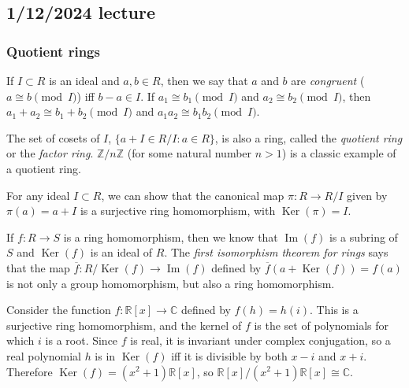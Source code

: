 \documentclass[12pt]{article}
\begin{document}
\subsection{1/12/2024 lecture}
\subsubsection{Quotient rings}
If $I \subset R$ is an ideal and $a, b \in R$, then we say that $a$ and $b$ are \textit{congruent} ($a \cong b \pmod{I}$) iff $b-a \in I$. If $a_1 \cong b_1 \pmod{I}$ and $a_2 \cong b_2 \pmod{I}$, then $a_1 + a_2 \cong b_1 + b_2 \pmod{I}$ and $a_1a_2 \cong b_1b_2 \pmod{I}$.
\par
The set of cosets of $I$, $\{a+I\in R/I:a\in R\}$, is also a ring, called the \textit{quotient ring} or the \textit{factor ring}. $ \mathbb{Z}/n \mathbb{Z}$ (for some natural number $n>1$) is a classic example of a quotient ring.
\par
For any ideal $I \subset R$, we can show that the canonical map $\pi: R \rightarrow R/I$ given by $\pi(a)=a+I$ is a surjective ring homomorphism, with $\operatorname{Ker}(\pi)=I$.
\par
If $f: R \rightarrow S$ is a ring homomorphism, then we know that $\operatorname{Im}(f)$ is a subring of $S$ and $\operatorname{Ker}(f)$ is an ideal of $R$. The \textit{first isomorphism theorem for rings} says that the map $\overline{f}:R/\operatorname{Ker}(f) \rightarrow \operatorname{Im}(f)$ defined by $\overline{f}(a+\operatorname{Ker}(f))=f(a)$ is not only a group homomorphism, but also a ring homomorphism.
\par
Consider the function $f: \mathbb{R}[x] \rightarrow \mathbb{C}$ defined by $f(h)=h(i)$. This is a surjective ring homomorphism, and the kernel of $f$ is the set of polynomials for which $i$ is a root. Since $f$ is real, it is invariant under complex conjugation, so a real polynomial $h$ is in $\operatorname{Ker}(f)$ iff it is divisible by both $x-i$ and $x+i$. Therefore $\operatorname{Ker}(f) = (x^2 + 1) \mathbb{R}[x]$, so $ \mathbb{R}[x] / (x^2 + 1) \mathbb{R}[x] \cong \mathbb{C}$.
\end{document}
